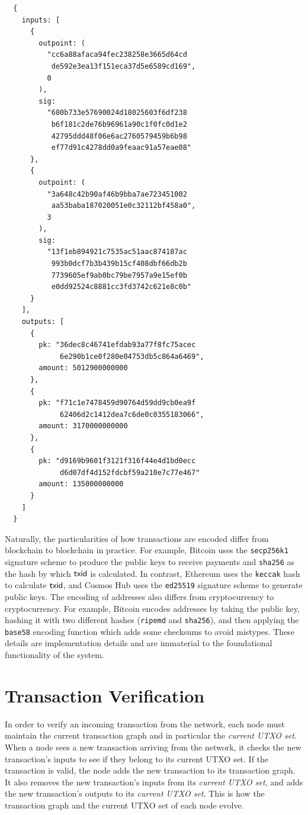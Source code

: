 \begin{Verbatim}
  {
    inputs: [
      {
        outpoint: (
          "cc6a88afaca94fec238258e3665d64cd
           de592e3ea13f151eca37d5e6589cd169",
          0
        ),
        sig:
          "680b733e57690024d18025603f6df238
           b6f181c2de76b96961a90c1f0fc0d1e2
           42795ddd48f06e6ac2760579459b6b98
           ef77d91c4278dd0a9feaac91a57eae08"
      },
      {
        outpoint: (
          "3a648c42b90af46b9bba7ae723451002
           aa53baba187020051e0c32112bf458a0",
          3
        ),
        sig:
          "13f1eb894921c7535ac51aac874187ac
           993b0dcf7b3b439b15cf408dbf66db2b
           7739605ef9ab0bc79be7957a9e15ef0b
           e0dd92524c8881cc3fd3742c621e8c0b"
      }
    ],
    outputs: [
      {
        pk: "36dec8c46741efdab93a77f8fc75acec
             6e290b1ce0f280e04753db5c864a6469",
        amount: 5012900000000
      },
      {
        pk: "f71c1e7478459d90764d59dd9cb0ea9f
             62406d2c1412dea7c6de0c0355183066",
        amount: 3170000000000
      },
      {
        pk: "d9169b9601f3121f316f44e4d1bd0ecc
             d6d07df4d152fdcbf59a210e7c77e467"
        amount: 135000000000
      }
    ]
  }
\end{Verbatim}

Naturally, the particularities of how transactions are encoded differ from blockchain
to blockchain in practice. For example, Bitcoin uses the \texttt{secp256k1} signature
scheme to produce the public keys to receive payments and
\texttt{sha256} as the hash by which $\mathsf{txid}$ is calculated.
In contrast, Ethereum uses the \texttt{keccak} hash to calculate $\mathsf{txid}$,
and Cosmos Hub uses the \texttt{ed25519} signature scheme to generate public keys.
The encoding of addresses also differs from cryptocurrency to cryptocurrency.
For example, Bitcoin encodes addresses by taking the public key,
hashing it with two different hashes (\texttt{ripemd} and \texttt{sha256}),
and then applying the \texttt{base58}
encoding function which adds some checksums to avoid mistypes.
These details are implementation details and are immaterial to the foundational
functionality of the system.

\section{Transaction Verification}

In order to verify an incoming transaction from the network, each node must maintain the current transaction
graph and in particular the \emph{current UTXO set}.
When a node sees a new transaction arriving from
the network, it checks the new transaction's inputs to see if they belong to its current UTXO set.
If the transaction is valid, the node adds the new transaction to its transaction graph.
It also removes the new transaction's inputs
from its \emph{current UTXO set}, and adds the new transaction's outputs to its \emph{current UTXO set}.
This is how the transaction graph and the current UTXO set of each node evolve.

